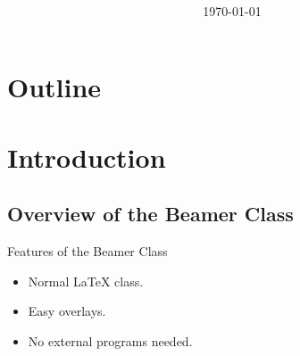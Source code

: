 \documentclass[hyperref={bookmarks=false}]{beamer}
\begin{document}
    \title[]{}
    \author{}
    \date{\today}

\begin{frame}
\titlepage
\end{frame}
    \section*{Outline}
\begin{frame}
    \tableofcontents
\end{frame}
    \section{Introduction}
    \subsection{Overview of the Beamer Class}
\begin{frame}{Features of the Beamer Class}

      \begin{itemize}
      \item<1-> Normal LaTeX class.
      \item<2-> Easy overlays.
      \item<3-> No external programs needed.
      \end{itemize}
\end{frame}
\end{document}
